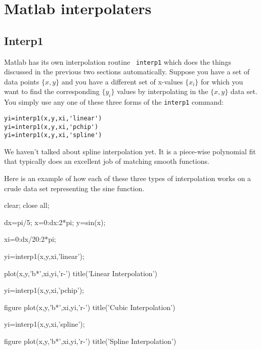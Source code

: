 \section{Matlab interpolaters}

\subsection*{Interp1}
 Matlab has its own interpolation routine {\tt
interp1} which does the things discussed in the previous two sections
automatically. Suppose you have a set of data points $\{x,y\}$ and
you have a different set of x-values $\{x_i\}$ for which you want to
find the corresponding $\{y_i\}$ values by interpolating in the
$\{x,y\}$ data set. You simply use any one of these three forms of
the {\tt interp1} command:
\begin{Verbatim}
yi=interp1(x,y,xi,'linear')
yi=interp1(x,y,xi,'pchip')
yi=interp1(x,y,xi,'spline')
\end{Verbatim}
We haven't talked about spline interpolation yet.  It is a
piece-wise polynomial fit that typically does an excellent job of
matching smooth functions.

Here is an example of how each of these three types of interpolation
works on a crude data set representing the sine function.

\begin{codeexample}
\begin{VerbatimOut}{\listingFile}
clear; close all;

dx=pi/5;
x=0:dx:2*pi;
y=sin(x);

xi=0:dx/20:2*pi;


yi=interp1(x,y,xi,'linear');

plot(x,y,'b*',xi,yi,'r-')
title('Linear Interpolation')

yi=interp1(x,y,xi,'pchip');

figure
plot(x,y,'b*',xi,yi,'r-')
title('Cubic Interpolation')

yi=interp1(x,y,xi,'spline');

figure
plot(x,y,'b*',xi,yi,'r-')
title('Spline Interpolation')
\end{VerbatimOut}
\end{codeexample}



